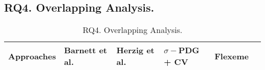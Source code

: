 \subsection{{\bf RQ4. Overlapping Analysis.}}

\begin{table}[t]
	\caption{RQ4. Overlapping Analysis.}
	\vspace{-0.1in}
	\begin{center}
		\footnotesize
		\tabcolsep 4pt
		\renewcommand{\arraystretch}{1} \begin{tabular}{p{1.4cm}<{\centering}|p{1.3cm}<{\centering}p{1.2cm}<{\centering}p{1.4cm}<{\centering}p{0.8cm}<{\centering}|p{0.7cm}<{\centering}}
			
			\hline
			Approaches          & Barnett et al. & Herzig et al. & $\sigma-$PDG + CV& Flexeme & \tool\\
			\hline
			\hline
		\end{tabular}
		\label{RQ4-result}
	\end{center}
\end{table}